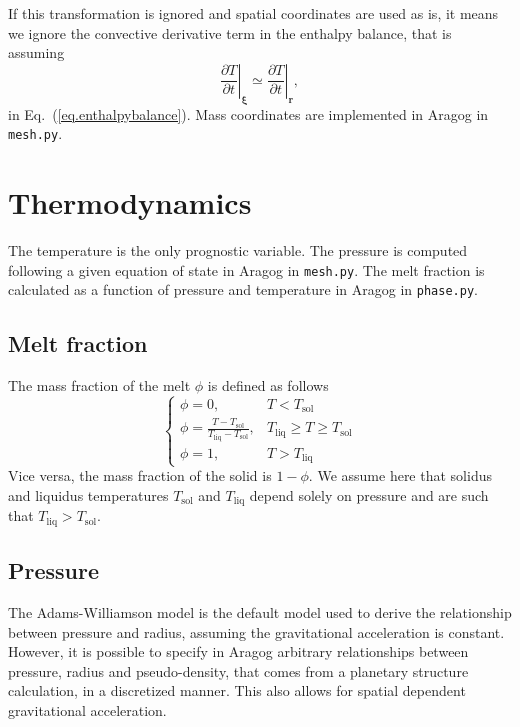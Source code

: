 \documentclass{article}
\renewcommand{\vec}[1]{\boldsymbol{#1}}
\begin{document}
If this transformation is ignored  and spatial coordinates are used as is, it means we ignore the convective derivative term in the enthalpy balance, that is assuming
\begin{equation}
    \left.\frac{\partial T}{\partial t}\right|_{\vec{\xi}} \simeq
    \left.\frac{\partial T}{\partial t}\right|_{\vec{r}},
\end{equation}
in Eq.~(\ref{eq.enthalpybalance}). Mass coordinates are implemented in Aragog in \texttt{mesh.py}.

\section{Thermodynamics}

The temperature is the only prognostic variable. The pressure is computed following a given equation of state in Aragog in \texttt{mesh.py}. The melt fraction is calculated as a function of pressure and temperature in Aragog in \texttt{phase.py}.

\subsection{Melt fraction}
\label{sec:thermophi}

The mass fraction of the melt $\phi$ is defined as follows
\begin{equation}
\begin{cases}
    \phi = 0, & T < T_\mathrm{sol} \\
    \phi= \frac{T-T_\mathrm{sol}}{T_\mathrm{liq}-T_\mathrm{sol}}, & T_\mathrm{liq} \geq T \geq T_\mathrm{sol}\\
    \phi = 1, & T > T_\mathrm{liq}
\end{cases}
\end{equation}
Vice versa, the mass fraction of the solid is $1-\phi$. We assume here that solidus and liquidus temperatures $T_\mathrm{sol}$ and $T_\mathrm{liq}$ depend solely on pressure and are such that $T_\mathrm{liq}>T_\mathrm{sol}$.

\subsection{Pressure}
\label{sec:thermoP}

The Adams-Williamson model is the default model used to derive the relationship between pressure and radius, assuming the gravitational acceleration is constant. However, it is possible to specify in Aragog arbitrary relationships between pressure, radius and pseudo-density, that comes from a planetary structure calculation, in a discretized manner. This also allows for spatial dependent gravitational acceleration.
\end{document}
